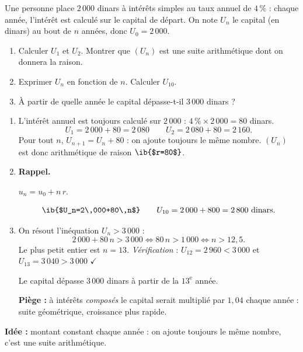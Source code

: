 
Une personne place $2\,000$ dinars à intérêts simples au taux annuel de $4\,\%$ : chaque année, l'intérêt est calculé sur le capital de départ. On note $U_n$ le capital (en dinars) au bout de $n$ années, donc $U_0=2\,000$.

\begin{enumerate}
  \item Calculer $U_1$ et $U_2$. Montrer que $(U_n)$ est une suite arithmétique dont on donnera la raison.
  \item Exprimer $U_n$ en fonction de $n$. Calculer $U_{10}$.
  \item À partir de quelle année le capital dépasse-t-il $3\,000$ dinars ?
\end{enumerate}

\begin{enumerate}
  \item L'intérêt annuel est toujours calculé sur $2\,000$ : $4\,\%\times2\,000=80$ dinars.
  $$U_1=2\,000+80=2\,080\qquad U_2=2\,080+80=2\,160.$$
  Pour tout $n$, $U_{n+1}=U_n+80$ : on ajoute toujours le même nombre. $(U_n)$ est donc arithmétique de raison $\ib{$r=80$}$.
  \item \textbf{Rappel.}\par
  \begin{prop}
  $u_n=u_0+n\,r$.
  \end{prop}
  $$ \ib{$U_n=2\,000+80\,n$}\qquad U_{10}=2\,000+800=2\,800\text{ dinars}.$$
  \item On résout l'inéquation $U_n>3\,000$ :
  $$2\,000+80\,n>3\,000\iff80\,n>1\,000\iff n>12{,}5.$$
  Le plus petit entier est $n=13$. \emph{Vérification} : $U_{12}=2\,960<3\,000$ et $U_{13}=3\,040>3\,000$ $\checkmark$

  Le capital dépasse $3\,000$ dinars à partir de la $13^{\text{e}}$ année.

  \textbf{Piège :} à intérêts \emph{composés} le capital serait multiplié par $1{,}04$ chaque année : suite géométrique, croissance plus rapide.
\end{enumerate}

\textbf{Idée :} montant constant chaque année : on ajoute toujours le même nombre, c'est une suite arithmétique.
